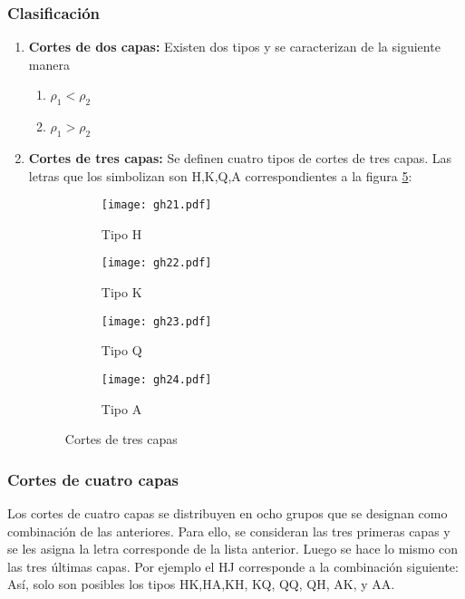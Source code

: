 \subsubsection{Clasificación}
\begin{enumerate}
    \item \textbf{Cortes de dos capas:} Existen dos tipos y se caracterizan de la siguiente manera \begin{enumerate}
        \item $\rho_1<\rho_2$
        \item $\rho_1>\rho_2$
    \end{enumerate}
    \item \textbf{Cortes de tres capas:} Se definen cuatro tipos de cortes de tres capas. Las letras que los simbolizan son H,K,Q,A correspondientes a la figura \ref{fig21-24}: 
    \begin{figure}[h!]
        \centering
        \begin{subfigure}[b]{0.4\linewidth}
            \texttt{[image: gh21.pdf]}
            \caption{Tipo H}
            \label{gh21}
        \end{subfigure}
        \begin{subfigure}[b]{0.4\linewidth}
            \texttt{[image: gh22.pdf]}
            \caption{Tipo K}
            \label{gh22}
        \end{subfigure}
        \begin{subfigure}[b]{0.4\linewidth}
            \texttt{[image: gh23.pdf]}
            \caption{Tipo Q}
            \label{gh23}
        \end{subfigure}
        \begin{subfigure}[b]{0.4\linewidth}
            \texttt{[image: gh24.pdf]}
            \caption{Tipo A}
            \label{gh24}
        \end{subfigure}
        \caption{Cortes de tres capas}
        \label{fig21-24}
    \end{figure} 
\end{enumerate}

\subsubsection{Cortes de cuatro capas}
Los cortes de cuatro capas se distribuyen en ocho grupos que se designan como combinación de las anteriores. Para ello, se consideran las tres primeras capas y se les asigna la letra corresponde de la lista anterior. Luego se hace lo mismo con las tres últimas capas. Por ejemplo el HJ corresponde a la combinación siguiente:
Así, solo son posibles los tipos HK,HA,KH, KQ, QQ, QH, AK, y AA.

